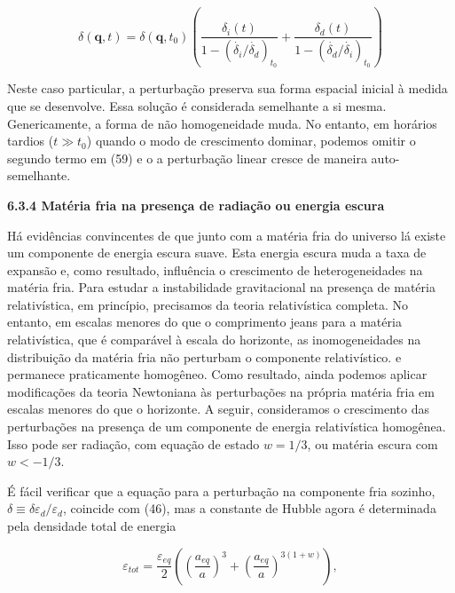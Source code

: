 \documentclass[a4paper,12pt]{article}
\begin{document}
\begin{equation}
	\delta (\mathbf{q},t) = \delta (\mathbf{q}, t_0)\left( \dfrac{\delta_i(t)}{1 - (\dot{\delta_i}/\dot{\delta_d})_{t_0}} + \dfrac{\delta_d(t)}{1 - (\dot{\delta_d}/\dot{\delta_i})_{t_0}}\right)
\end{equation}

Neste caso particular, a perturbação preserva sua forma espacial inicial à medida que se desenvolve. Essa solução é considerada semelhante a si mesma.
Genericamente, a forma de não homogeneidade muda. No entanto, em horários tardios ($t \gg t_0$)
quando o modo de crescimento dominar, podemos omitir o segundo termo em (59) e o
a perturbação linear cresce de maneira auto-semelhante.
\newline

\begin{center}
	\textbf{6.3.4 Matéria fria na presença de radiação ou energia escura}
\end{center}

Há evidências convincentes de que junto com a matéria fria do universo lá
existe um componente de energia escura suave. Esta energia escura muda a taxa de expansão e, como resultado, influência o crescimento de heterogeneidades na matéria fria.
Para estudar a instabilidade gravitacional na presença de matéria relativística, em princípio, precisamos da teoria relativística completa. No entanto, em escalas menores do que o comprimento jeans
para a matéria relativística, que é comparável à escala do horizonte, as inomogeneidades na distribuição da matéria fria não perturbam o componente relativístico.
e permanece praticamente homogêneo. Como resultado, ainda podemos aplicar modificações da
teoria Newtoniana às perturbações na própria matéria fria em escalas menores
do que o horizonte. A seguir, consideramos o crescimento das perturbações na
presença de um componente de energia relativística homogênea. Isso pode ser radiação,
com equação de estado $w = 1/3$, ou matéria escura com $w < - 1/3$.

É fácil verificar que a equação para a perturbação na componente fria
sozinho, $\delta \equiv \delta\varepsilon_d / \varepsilon_d$, coincide com (46), mas a constante de Hubble agora é determinada
pela densidade total de energia

\begin{equation}
	\varepsilon_{tot} = \dfrac{\varepsilon_{eq}}{2}\left( \left( \dfrac{a_{eq}}{a}\right)^3 + \left(\dfrac{a_{eq}}{a} \right)^{3 (1+w)}\right),
\end{equation}
\end{document}
